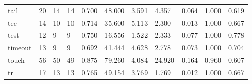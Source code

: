 \begin{longtable}{lp{1.2cm}p{1.2cm}p{1.2cm}p{1.2cm}p{1.2cm}p{1.2cm}p{1.2cm}p{1.2cm}p{1.2cm}p{1.2cm}}
tail      &                           20 &                 14 &                                14 &                                      0.700 &                                 48.000 &                                        3.591 &                             4.357 &                                   0.064 &                              1.000 &                                              0.619 \\
tee       &                           14 &                 10 &                                10 &                                      0.714 &                                 35.600 &                                        5.113 &                             2.300 &                                   0.013 &                              1.000 &                                              0.667 \\
test      &                           12 &                  9 &                                 9 &                                      0.750 &                                 16.556 &                                        1.522 &                             2.333 &                                   0.077 &                              1.000 &                                              0.778 \\
timeout   &                           13 &                  9 &                                 9 &                                      0.692 &                                 41.444 &                                        4.628 &                             2.778 &                                   0.073 &                              1.000 &                                              0.704 \\
touch     &                           56 &                 50 &                                49 &                                      0.875 &                                 79.260 &                                        4.084 &                            24.920 &                                   0.164 &                              0.960 &                                              0.607 \\
tr        &                           17 &                 13 &                                13 &                                      0.765 &                                 49.154 &                                        3.769 &                             1.769 &                                   0.012 &                              1.000 &                                              0.667 \\

\end{longtable}
